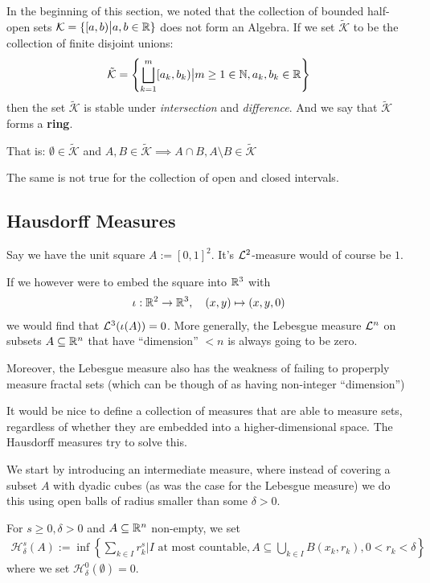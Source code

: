 
\begin{rem}[] \label{rem:half-open-ring}
In the beginning of this section, we noted that the collection of bounded half-open sets 
$\mathcal{K} = \{[a,b) \big\vert a,b \in \mathbb{R}\}$
does not form an Algebra.
If we set $\tilde{\mathcal{K}}$ to be the 
collection of finite disjoint unions:
\begin{align*}
  \tilde{\mathcal{K}} = \left\{
    \bigsqcup_{k=1}^{m} [a_k,b_k) \big\vert m \geq 1 \in \mathbb{N}, a_k,b_k \in \mathbb{R}
  \right\}
\end{align*}
then the set $\tilde{\mathcal{K}}$ is stable under \emph{intersection} and \emph{difference}.
And we say that $\tilde{\mathcal{K}}$ forms a \textbf{ring}.

That is: $\emptyset \in \tilde{\mathcal{K}}$ and $A,B \in \tilde{\mathcal{K}} \implies A \cap B, A \setminus B \in \tilde{\mathcal{K}}$

The same is not true for the collection of open and closed intervals.
\end{rem}




\subsection{Hausdorff Measures}

Say we have the unit square $A := [0,1]^{2}$. It's $\mathcal{L}^{2}$-measure would of course be $1$.

If we however were to embed the square into $\mathbb{R}^{3}$ with
\begin{align*}
  \iota: \mathbb{R}^{2} \to \mathbb{R}^{3}, \quad (x,y) \mapsto  (x,y,0)
\end{align*}
we would find that $\mathcal{L}^{3}(\iota(A)) = 0$.
More generally, the Lebesgue measure $\mathcal{L}^{n}$ on subsets $A \subseteq \mathbb{R}^{n}$ that have ``dimension'' $< n$ is always going to be zero.

Moreover, the Lebesgue measure also has the weakness of failing to properply measure fractal sets (which can be though of as having non-integer ``dimension'')

It would be nice to define a collection of measures that are able to measure sets, regardless of whether they are embedded into a higher-dimensional space.
The Hausdorff measures try to solve this.

We start by introducing an intermediate measure, where instead of covering a subset $A$ with dyadic cubes (as was the case for the Lebesgue measure)
we do this using open balls of radius smaller than some $\delta >0 $.
\begin{dfn}[]
For $s \geq 0, \delta > 0$ and $A \subseteq \mathbb{R}^{n}$ non-empty, we set
\begin{align*}
  \mathcal{H}_{\delta}^{s}(A) := \inf \left\{
    \sum_{k \in I}r_k^{s}
    \bigg\vert
    I \text{ at most countable},
    A \subseteq \bigcup_{k \in I}B(x_k,r_k), 0< r_k < \delta
  \right\}
\end{align*}
where we set $\mathcal{H}_{\delta}^{0}(\emptyset) = 0$.
\end{dfn}


